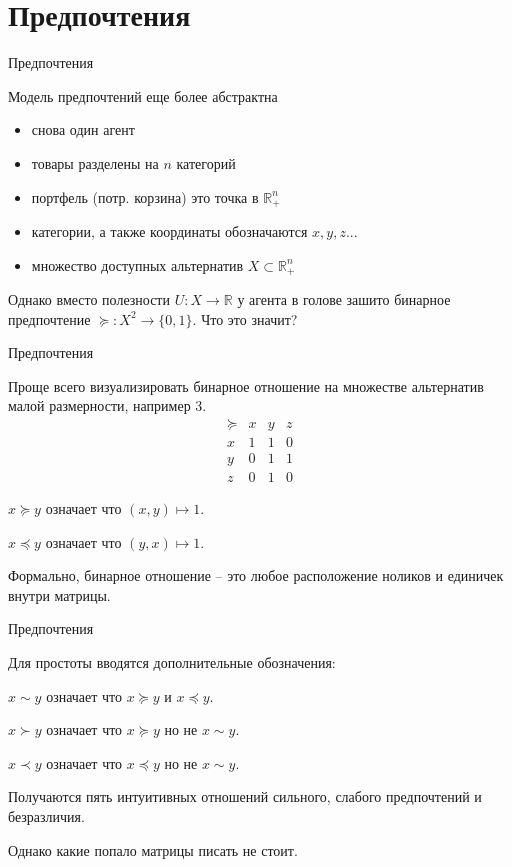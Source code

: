 \documentclass{beamer}
\begin{document}
\section{Предпочтения}

\begin{frame}{Предпочтения}

Модель предпочтений еще более абстрактна

\begin{itemize}
\item снова один агент
\item товары разделены на $n$ категорий
\item портфель (потр. корзина) это точка в $\mathbb{R}_{+}^{n}$	
\item категории, а также координаты обозначаются $x, y, z...$
\item множество доступных альтернатив $X \subset \mathbb{R}_{+}^{n}$
\end{itemize}

Однако вместо полезности $U: X \to \mathbb{R}$ у агента в голове зашито бинарное предпочтение $\succcurlyeq: X^2 \to \{0,1\}.$ Что это значит?

\end{frame}

\begin{frame}{Предпочтения}

Проще всего визуализировать бинарное отношение на множестве альтернатив малой размерности, например 3.
$$
\begin{array}{c|ccc}
 \succcurlyeq & x & y & z\\
\hline
x & 1 & 1 & 0 \\
y & 0 & 1 & 1\\
z & 0 & 1 & 0
\end{array}
$$

$x \succcurlyeq y$ означает что $(x,y) \mapsto 1$.

$x \preccurlyeq y$ означает что $(y,x) \mapsto 1$.

Формально, бинарное отношение – это любое расположение ноликов и единичек внутри матрицы.

\end{frame}

\begin{frame}{Предпочтения}

Для простоты вводятся дополнительные обозначения:

$x \sim y$ означает что $x \succcurlyeq y$ и $x \preccurlyeq y$.

$x \succ y$ означает что $x \succcurlyeq y$ но не $x \sim y$.

$x \prec y$ означает что $x \preccurlyeq y$ но не $x \sim y$.

Получаются пять интуитивных отношений сильного, слабого предпочтений и безразличия.

Однако какие попало матрицы писать не стоит.

\end{frame}
\end{document}
